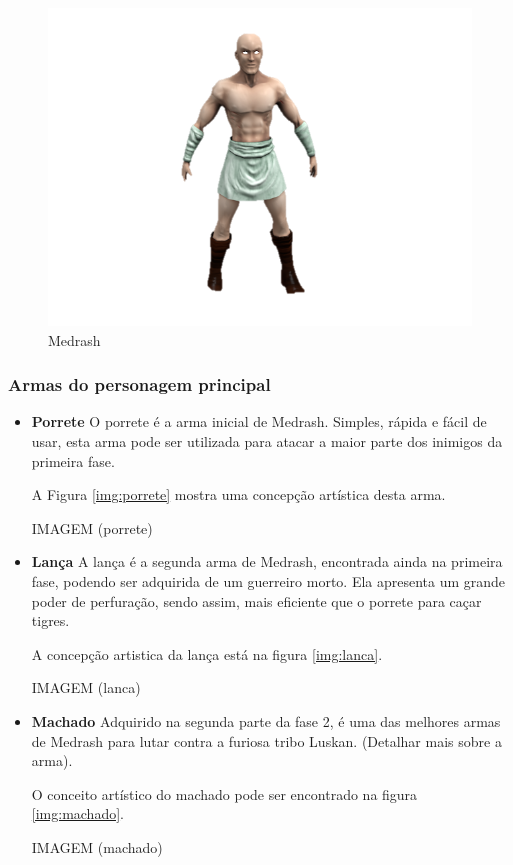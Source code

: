 \begin{figure}[!ht]
 \centering
 \includegraphics[scale=0.5]{Imagens/medrash01.png}
 \caption{Medrash}
 \label{img:medrash}
\end{figure}


\subsubsection{Armas do personagem principal}
\begin{itemize}
\item {\bf Porrete}
O porrete é a arma inicial de Medrash. Simples, rápida e fácil de usar,
 esta arma pode ser utilizada para atacar a maior parte dos inimigos da
 primeira fase.

A Figura \ref{img:porrete} mostra uma concepção artística desta arma.

IMAGEM (porrete)

\item {\bf Lança}
A lança é a segunda arma de Medrash, encontrada ainda na primeira fase,
 podendo ser adquirida de um guerreiro morto. Ela apresenta um grande poder
 de perfuração, sendo assim, mais eficiente que o porrete para caçar
 tigres.

A concepção artistica da lança está na figura \ref{img:lanca}.

IMAGEM (lanca)

\item {\bf Machado}
Adquirido na segunda parte da fase 2, é uma das melhores armas de Medrash
 para lutar contra a furiosa tribo Luskan. (Detalhar mais sobre a arma).

O conceito artístico do machado pode ser encontrado na figura 
\ref{img:machado}.

IMAGEM (machado)

\end{itemize}

